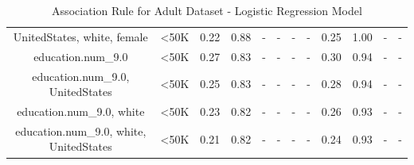 \begin{table}[H]
{\begin{tabular}{|c|c|c|c|c|c|c|c|c|c|c|c|}
UnitedStates, white, female & <50K & 0.22 & 0.88 & - & - & - & - & 0.25 & 1.00 & - & - \\
education.num\_9.0 & <50K & 0.27 & 0.83 & - & - & - & - & 0.30 & 0.94 & - & - \\
education.num\_9.0, UnitedStates & <50K & 0.25 & 0.83 & - & - & - & - & 0.28 & 0.94 & - & - \\
education.num\_9.0, white & <50K & 0.23 & 0.82 & - & - & - & - & 0.26 & 0.93 & - & - \\
education.num\_9.0, white, UnitedStates & <50K & 0.21 & 0.82 & - & - & - & - & 0.24 & 0.93 & - & - \\
        \hline
        \end{tabular}
        }
        \\[10pt]
        \caption{Association Rule for Adult Dataset - Logistic Regression Model}
        \label{table:asso_rules_adult_Logistic Regression}
        \end{table}
        